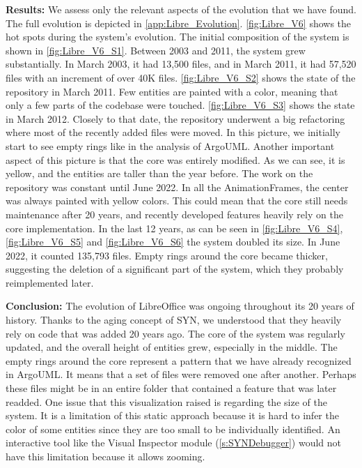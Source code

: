 \bigbreak
\noindent
\textbf{Results:}
We assess only the relevant aspects of the evolution that we have found. The full evolution is depicted in \autoref{app:Libre_Evolution}. \autoref{fig:Libre_V6} shows the hot spots during the system's evolution. The initial composition of the system is shown in \autoref{fig:Libre_V6_S1}. Between 2003 and 2011, the system 
grew substantially. In March 2003, it had 13,500 files, and in March 2011, it had 57,520 files with an increment of over 40K files. \autoref{fig:Libre_V6_S2} shows the state of the repository in March 2011. Few entities are painted with a color, meaning that only a few parts of the codebase were touched. \autoref{fig:Libre_V6_S3} shows the state in March 2012. Closely to that date, the repository underwent a big refactoring where most of the recently added files were moved. In this picture, we initially start to see empty rings like in the analysis of ArgoUML. Another important aspect of this picture is that the core was entirely modified. As we can see, it is yellow, and the entities are taller than the year before. The work on the repository was constant until June 2022. In all the AnimationFrames, the center was always painted with yellow colors. This could mean that the core still needs maintenance after 20 years, and recently developed features heavily rely on the core implementation. In the last 12 years, as can be seen in \autoref{fig:Libre_V6_S4}, \autoref{fig:Libre_V6_S5} and \autoref{fig:Libre_V6_S6} the system doubled its size. In June 2022, it counted 135,793 files. Empty rings around the core became thicker, suggesting the deletion of a significant part of the system, which they probably reimplemented later.

\bigbreak
\noindent
\textbf{Conclusion:} The evolution of LibreOffice was ongoing throughout its 20 years of history. 
Thanks to the aging concept of SYN, we understood that they heavily rely on code that was added 20 years ago. The core of the system was regularly updated, and the overall height of entities grew, especially in the middle. The empty rings around the core represent a pattern that we have already recognized in ArgoUML. It means that a set of files were removed one after another. Perhaps these files might be in an entire folder that contained a feature that was later readded. One issue that this visualization raised is regarding the size of the system. It is a limitation of this static approach because it is hard to infer the color of some entities since they are too small to be individually identified. An interactive tool like the Visual Inspector module (\autoref{s:SYNDebugger}) would not have this limitation because it allows zooming. 


